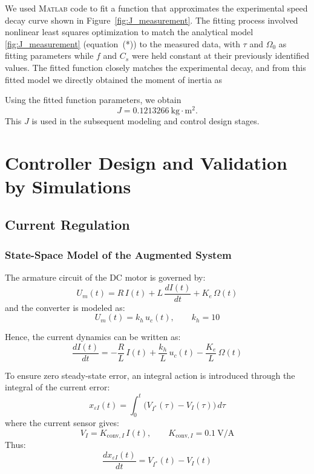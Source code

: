 \documentclass{rapportCS}
\begin{document}
\noindent
We used \textsc{Matlab} code to fit a function that approximates the experimental speed decay curve shown in Figure~\ref{fig:J_measurement}. The fitting process involved nonlinear least squares optimization to match the analytical model \eqref{fig:J_measurement} (equation~(*)) to the measured data, with $\tau$ and $\Omega_0$ as fitting parameters while $f$ and $C_s$ were held constant at their previously identified values. The fitted function closely matches the experimental decay, and from this fitted model we directly obtained the moment of inertia as

\noindent
Using the fitted function parameters, we obtain
\[
\boxed{J = 0.1213266~\mathrm{kg\cdot m^2}}.
\]
This $J$ is used in the subsequent modeling and control design stages.



\newpage

\section{Controller Design and Validation by Simulations}

\subsection{Current Regulation}
\subsubsection{State-Space Model of the Augmented System}

The armature circuit of the DC motor is governed by:
\begin{equation*}
U_m(t) = R\,I(t) + L\,\frac{dI(t)}{dt} + K_e\,\Omega(t)
\end{equation*}
and the converter is modeled as:
\begin{equation*}
U_m(t) = k_h\,u_c(t), \qquad k_h = 10
\end{equation*}

Hence, the current dynamics can be written as:
\begin{equation*}
\frac{dI(t)}{dt} = -\frac{R}{L}\,I(t) + \frac{k_h}{L}\,u_c(t) - \frac{K_e}{L}\,\Omega(t)
\end{equation*}

To ensure zero steady-state error, an integral action is introduced through the integral of the current error:
\begin{equation*}
x_{\varepsilon I}(t) = \int_0^t \big(V_{I^*}(\tau) - V_I(\tau)\big)\,d\tau
\end{equation*}
where the current sensor gives:
\begin{equation*}
V_I = K_{\mathrm{conv},I}\,I(t), \qquad K_{\mathrm{conv},I} = 0.1~\text{V/A}
\end{equation*}
Thus:
\begin{equation*}
\frac{dx_{\varepsilon I}(t)}{dt} = V_{I^*}(t) - V_I(t)
\end{equation*}
\end{document}
